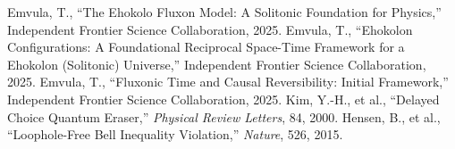 \documentclass[11pt]{article}
\begin{document}
\begin{thebibliography}{5}
 Emvula, T., ``The Ehokolo Fluxon Model: A Solitonic Foundation for Physics,'' Independent Frontier Science Collaboration, 2025.
 Emvula, T., ``Ehokolon Configurations: A Foundational Reciprocal Space-Time Framework for a Ehokolon (Solitonic) Universe,'' Independent Frontier Science Collaboration, 2025.
 Emvula, T., ``Fluxonic Time and Causal Reversibility: Initial Framework,'' Independent Frontier Science Collaboration, 2025.
 Kim, Y.-H., et al., ``Delayed Choice Quantum Eraser,'' \textit{Physical Review Letters}, 84, 2000.
 Hensen, B., et al., ``Loophole-Free Bell Inequality Violation,'' \textit{Nature}, 526, 2015.
\end{thebibliography}
\end{document}
